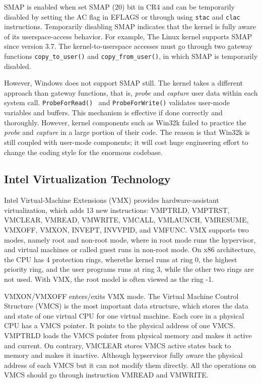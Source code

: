 SMAP is enabled when set SMAP (20) bit in CR4 and can be temporarily disabled by setting the AC flag in EFLAGS or through using \texttt{stac} and \texttt{clac} instructions. Temporarily disabling SMAP indicates that the kernel is fully aware of its userspace-access behavior. For example, The Linux kernel supports SMAP since version 3.7. The kernel-to-userspace accesses must go through two gateway functions \texttt{copy\_to\_user()} and \texttt{copy\_from\_user()}, in which SMAP is temporarily disabled.

However, Windows does not support SMAP still. The kernel takes a different approach than gateway functions, that is, \textit{probe} and \textit{capture} user data within each system call. \texttt{ProbeForRead()}~\cite{probeforread} and \texttt{ProbeForWrite()} validates user-mode variables and buffers. This mechanism is effective if done correctly and thoroughly. However, kernel components such as Win32k failed to practice the \textit{probe} and \textit{capture} in a large portion of their code.  The reason is that Win32k is still coupled with user-mode components; it will cost huge engineering effort to change the coding style for the enormous codebase.


\subsection{Intel Virtualization Technology}

Intel Virtual-Machine Extensions (VMX) provides hardware-assistant virtualization, which adds 13 new instructions: VMPTRLD, VMPTRST, VMCLEAR, VMREAD, VMWRITE, VMCALL, VMLAUNCH, VMRESUME, VMXOFF, VMXON, INVEPT, INVVPID, and VMFUNC. VMX supports two modes, namely root and non-root mode, where in root mode runs the hypervisor, and virtual machines or called guest runs in non-root mode. On x86 architecture, the CPU has 4 protection rings, wherethe kernel runs at ring 0, the highest priority ring, and the user programs runs at ring 3, while the other two rings are not used. With VMX, the root model is often viewed as the ring -1. 

VMXON/VMXOFF enters/exits VMX mode. The Virtual Machine Control Structure (VMCS) is the most important data structure, which stores the data and state of one virtual CPU for one virtual machine. Each core in a physical CPU has a VMCS pointer. It points to the physical address of one VMCS. VMPTRLD loads the VMCS pointer from physical memory and makes it active and current. On contrary, VMCLEAR stores VMCS active states back to memory and makes it inactive. Although hypservisor fully aware the physical address of each VMCS but it can not modify them directly. All the operations on VMCS should go through instruction VMREAD and VMWRITE. 


